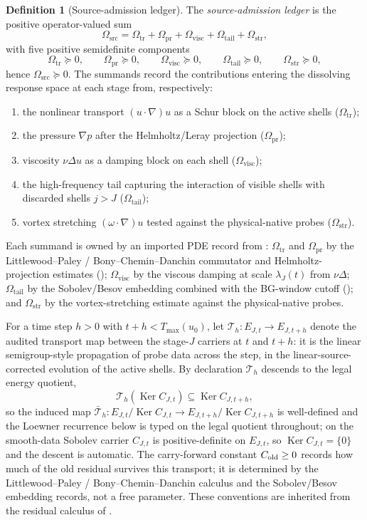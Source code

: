 \documentclass[11pt]{article}
\DeclareMathOperator{\Ker}{Ker}
\newcommand{\Tmax}{T_{\max}}
\newcommand{\Omsrc}{\Omega_{\mathrm{src}}}
\newcommand{\Omtr}{\Omega_{\mathrm{tr}}}
\newcommand{\Ompr}{\Omega_{\mathrm{pr}}}
\newcommand{\Omvisc}{\Omega_{\mathrm{visc}}}
\newcommand{\Omtail}{\Omega_{\mathrm{tail}}}
\newcommand{\Omstr}{\Omega_{\mathrm{str}}}
\newcommand{\lambdaJ}{\lambda_J}
\theoremstyle{definition}
\newtheorem{definition}[theorem]{Definition}
\begin{document}
\begin{definition}[Source-admission ledger]\label{def:ns:source-admission-ledger}
The \emph{source-admission ledger} is the positive
operator-valued sum
\[
  \Omsrc = \Omtr + \Ompr + \Omvisc + \Omtail + \Omstr ,
\]
with five positive semidefinite components
\[
  \Omtr\succeq 0,\qquad
  \Ompr\succeq 0,\qquad
  \Omvisc\succeq 0,\qquad
  \Omtail\succeq 0,\qquad
  \Omstr\succeq 0,
\]
hence \(\Omsrc\succeq 0\).  The summands record the
contributions entering the dissolving response space at each
stage from, respectively:
\begin{enumerate}[label=(\alph*)]
  \item the nonlinear transport \((u\cdot\nabla)u\) as a Schur
    block on the active shells (\(\Omtr\));
  \item the pressure \(\nabla p\) after the Helmholtz/Leray
    projection (\(\Ompr\));
  \item viscosity \(\nu\Delta u\) as a damping block on each
    shell (\(\Omvisc\));
  \item the high-frequency tail capturing the interaction of
    visible shells with discarded shells \(j>J\)
    (\(\Omtail\));
  \item vortex stretching \((\omega\cdot\nabla)u\) tested
    against the physical-native probes (\(\Omstr\)).
\end{enumerate}
Each summand is owned by an imported PDE record from
: \(\Omtr\) and \(\Ompr\) by the
Littlewood--Paley / Bony--Chemin--Danchin commutator and
Helmholtz-projection estimates
(); \(\Omvisc\) by the viscous
damping at scale \(\lambdaJ(t)\) from \(\nu\Delta\);
\(\Omtail\) by the Sobolev/Besov embedding combined with
the BG-window cutoff ();
and \(\Omstr\) by the vortex-stretching estimate against
the physical-native probes.
\end{definition}

For a time step \(h>0\) with \(t+h<\Tmax(u_0)\), let
\(\mathcal T_h:E_{J,t}\to E_{J,t+h}\) denote the audited transport map
between the stage-\(J\) carriers at \(t\) and \(t+h\): it is the
linear semigroup-style propagation of probe data across the step, in
the linear-source-corrected evolution of the active shells.  By
declaration \(\mathcal T_h\) descends to the legal energy quotient,
\[
  \mathcal T_h(\Ker C_{J,t})\subseteq \Ker C_{J,t+h},
\]
so the induced map
\(\bar{\mathcal T}_h:E_{J,t}/\Ker C_{J,t}\to E_{J,t+h}/\Ker C_{J,t+h}\)
is well-defined and the Loewner recurrence below is typed on the
legal quotient throughout; on the smooth-data Sobolev carrier
\(C_{J,t}\) is positive-definite on \(E_{J,t}\), so
\(\Ker C_{J,t}=\{0\}\) and the descent is automatic.  The carry-forward
constant \(C_{\rm old}\ge 0\) records how much of the old residual
survives this transport; it is determined by the Littlewood--Paley /
Bony--Chemin--Danchin calculus and the Sobolev/Besov embedding
records, not a free parameter.  These conventions are inherited from
the residual calculus of \citet{Tsiokos2026XiCompanion}.
\end{document}
